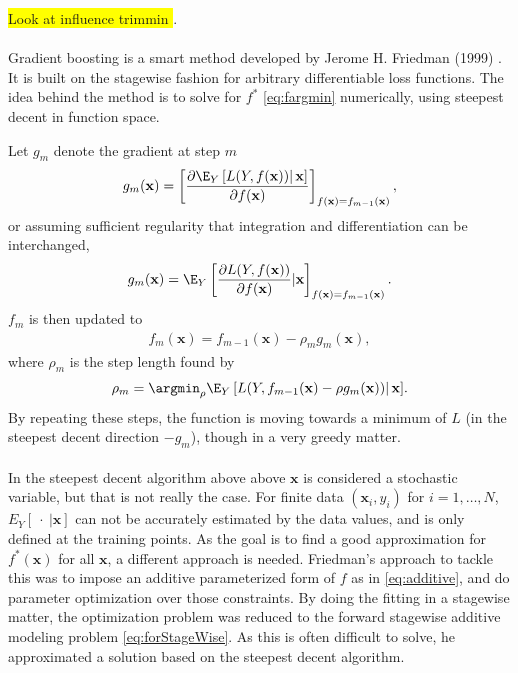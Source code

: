 \colorbox{yellow}{Look at influence trimmin \cite{friedman}}.
\\
\\Gradient boosting is a smart method developed by Jerome H. Friedman (1999) \cite{friedman}. It is built on the stagewise fashion for arbitrary differentiable loss functions. The idea behind the method is to solve for $f^*$ \eqref{eq:fargmin} numerically, using steepest decent in function space.

Let $g_m$ denote the gradient at step $m$
\begin{align}
  g_{m}(\mathbf{x}) = \left[ \frac{\partial \E_{Y} \left[ L(Y, f(\mathbf{x})) \right | \mathbf{x}]}{\partial f(\mathbf{x})}  \right]_{f(\mathbf{x}) = f_{m-1}(\mathbf{x})},
\end{align}
or assuming sufficient regularity that integration and differentiation can be interchanged, 
\begin{align}
  g_{m}(\mathbf{x}) = \E_{Y} \left[ \frac{\partial L(Y, f(\mathbf{x})) }{\partial f(\mathbf{x})}  | \mathbf{x}\right]_{f(\mathbf{x}) = f_{m-1}(\mathbf{x})}.
\end{align}
$f_m$ is then updated to
\begin{align}
  f_m(\mathbf{x}) = f_{m-1}(\mathbf{x}) - \rho_m  g_m(\mathbf{x}),
\end{align}
where $\rho_m$ is the step length found by
\begin{align}
  \rho_m = \argmin_{\rho}  \E_{Y} \left[ L(Y, f_{m-1}(\mathbf{x}) - \rho g_m(\mathbf{x})) \right | \mathbf{x}].
\end{align}
By repeating these steps, the function is moving towards a minimum of $L$ (in the steepest decent direction $-g_m$), though in a very greedy matter. \\
\\
In the steepest decent algorithm above above $\mathbf{x}$ is considered a stochastic variable, but that is not really the case. For finite data $(\mathbf{x}_i, y_i)$ for $i = 1, \ldots, N$, $E_Y \left[\: \cdot \:| \mathbf{x} \right]$ can not be accurately estimated by the data values, and is only defined at the training points. As the goal is to find a good approximation for $f^*(\mathbf{x})$ for all $\mathbf{x}$, a different approach is needed. Friedman's approach to tackle this was to impose an additive parameterized form of $f$ as in \eqref{eq:additive}, and do parameter optimization over those constraints. By doing the fitting in a stagewise matter, the optimization problem was reduced to the forward stagewise additive modeling problem \eqref{eq:forStageWise}. As this is often difficult to solve, he approximated a solution based on the steepest decent algorithm.

